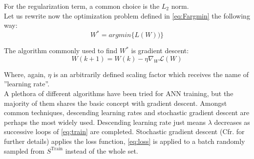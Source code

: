 For the regularization term, a common choice is the $L_2$ norm.\\
%
\indent Let us rewrite now the optimization problem defined in \cref{eq:Fargmin} the following way:
\begin{equation}
	W^* = argmin\{L(W))\}
\end{equation}

The algorithm commonly used to find $W^*$ is gradient descent:
\begin{equation}\label{eq:train}
	W(k+1)=W(k)-\eta\nabla_W\mathcal{L}(W)
\end{equation}

Where, again, $\eta$ is an arbitrarily defined scaling factor which receives the name of ''learning rate''.\\
%
\indent A plethora of different algorithms have been tried for ANN training, but the majority of them shares the basic concept with gradient descent. Amongst common techniques, descending learning rates and stochastic gradient descent are perhaps the most widely used. Descending learning rate just means $\lambda$ decreases as successive loops of \cref{eq:train} are completed. Stochastic gradient descent (Cfr. \cite{Marsland2015Machine} for further details) applies the loss function, \cref{eq:loss} is applied to a batch randomly sampled from $S^\text{Train}$ instead of the whole set.
%
